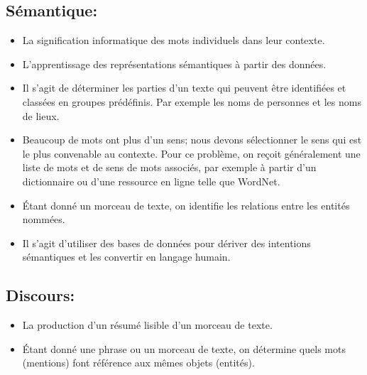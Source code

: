 \subsection{Sémantique:}
\begin{itemize}

    \item {}
          La signification informatique des mots individuels dans leur contexte.
    \item {}
          L'apprentissage des représentations sémantiques à partir des données.
    \item {}
          Il s'agit de déterminer les parties d'un texte qui peuvent être identifiées et classées en groupes prédéfinis. Par exemple les noms de personnes et les noms de lieux.
    \item {}
          Beaucoup de mots ont plus d'un sens; nous devons sélectionner le sens qui est le plus convenable au contexte. Pour ce problème, on reçoit généralement une liste de mots et de sens de mots associés, par exemple à partir d'un dictionnaire ou d'une ressource en ligne telle que WordNet.
    \item {}
          Étant donné un morceau de texte, on identifie les relations entre les entités nommées.
    \item {}
          Il s'agit d'utiliser des bases de données pour dériver des intentions sémantiques et les convertir en langage humain.
\end{itemize}
\subsection{Discours:}
\begin{itemize}
    \item {}
          La production d'un résumé lisible d'un morceau de texte.
    \item {}
          Étant donné une phrase ou un morceau de texte, on détermine quels mots (mentions) font référence aux mêmes objets (entités).
\end{itemize}

